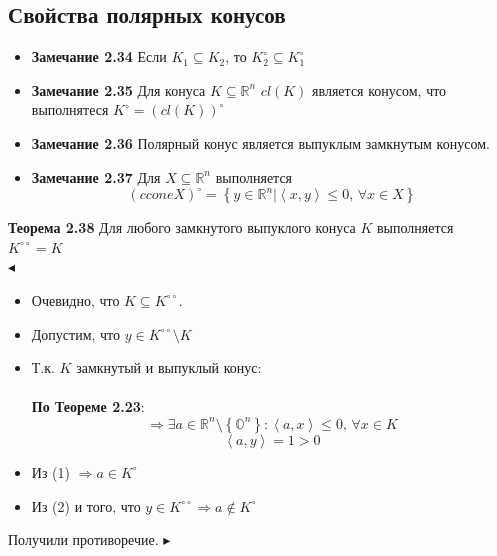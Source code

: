  \subsection{Свойства полярных конусов}
\begin{itemize}
\item \noindent\textbf{Замечание 2.34} Если $K_{1} \subseteq K_{2}$, то $K_{2}^{\circ} \subseteq K_{1}^{\circ}$
\item \noindent\textbf{Замечание 2.35} Для конуса $K\subseteq \mathbb{R}^n$ $cl(K)$ является конусом, что выполнятеся $K^{\circ}=(cl(K))^{\circ} $
\item \noindent\textbf{Замечание 2.36} Полярный конус является выпуклым замкнутым конусом.
\item \noindent\textbf{Замечание 2.37} Для $X\subseteq \mathbb{R}^n$ выполняется
\begin{equation*}
(cconeX)^{\circ}=\left\lbrace y \in \mathbb{R}^n | \left\langle x,y \right\rangle \leq 0 \text{, } \forall x \in X \right\rbrace
\end{equation*}
\end{itemize}
\noindent\textbf{Теорема 2.38} Для любого замкнутого выпуклого конуса $K$ выполняется $K^{\circ \circ}= K$\\
$\blacktriangleleft$
\begin{itemize}
\item  Очевидно, что $K\subseteq K^{\circ \circ}$.
\item  Допустим, что $y \in K^{\circ \circ} \setminus K$
\item  Т.к. $K$ замкнутый и выпуклый конус:\\ \\
\textbf{По Теореме 2.23}:
\begin{equation*} \tag{1}
\Longrightarrow \exists a\in\mathbb{R}^{n} \setminus \left\lbrace \mathbb{O}^{n} \right\rbrace :
\left\langle a,x \right\rangle \leq 0 \text{, } \forall x \in K
\end{equation*}
\begin{equation*} \tag{2}
\left\langle a,y \right\rangle = 1 > 0
\end{equation*}
\item Из (1) $\Longrightarrow a \in K^{\circ}$
\item Из (2) и того, что $y \in K^{\circ \circ} \Longrightarrow a \notin K^{\circ}$
\end{itemize}
Получили противоречие.
$\blacktriangleright$
